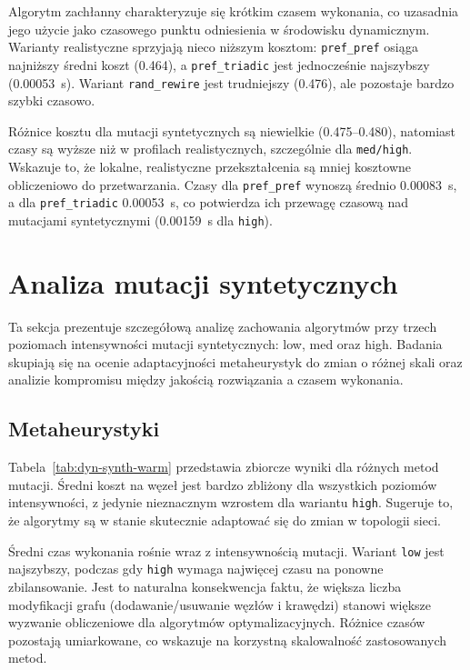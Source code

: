 Algorytm zachłanny charakteryzuje się krótkim czasem wykonania, co uzasadnia jego użycie jako czasowego punktu odniesienia w środowisku dynamicznym. Warianty realistyczne sprzyjają nieco niższym kosztom: \texttt{pref\_pref} osiąga najniższy średni koszt (0.464), a \texttt{pref\_triadic} jest jednocześnie najszybszy (\SI{0.00053}{\s}). Wariant \texttt{rand\_rewire} jest trudniejszy (0.476), ale pozostaje bardzo szybki czasowo.

Różnice kosztu dla mutacji syntetycznych są niewielkie (0.475--0.480), natomiast czasy są wyższe niż w profilach realistycznych, szczególnie dla \texttt{med/high}. Wskazuje to, że lokalne, realistyczne przekształcenia są mniej kosztowne obliczeniowo do przetwarzania. Czasy dla \texttt{pref\_pref} wynoszą średnio \SI{0.00083}{\s}, a dla \texttt{pref\_triadic} \SI{0.00053}{\s}, co potwierdza ich przewagę czasową nad mutacjami syntetycznymi (\SI{0.00159}{\s} dla \texttt{high}).

\section{Analiza mutacji syntetycznych}

Ta sekcja prezentuje szczegółową analizę zachowania algorytmów przy trzech poziomach intensywności mutacji syntetycznych: low, med oraz high. Badania skupiają się na ocenie adaptacyjności metaheurystyk do zmian o różnej skali oraz analizie kompromisu między jakością rozwiązania a czasem wykonania.

\subsection{Metaheurystyki}

Tabela~\ref{tab:dyn-synth-warm} przedstawia zbiorcze wyniki dla różnych metod mutacji. Średni koszt na węzeł jest bardzo zbliżony dla wszystkich poziomów intensywności, z jedynie nieznacznym wzrostem dla wariantu \texttt{high}. Sugeruje to, że algorytmy są w stanie skutecznie adaptować się do zmian w topologii sieci.

Średni czas wykonania rośnie wraz z intensywnością mutacji. Wariant \texttt{low} jest najszybszy, podczas gdy \texttt{high} wymaga najwięcej czasu na ponowne zbilansowanie. Jest to naturalna konsekwencja faktu, że większa liczba modyfikacji grafu (dodawanie/usuwanie węzłów i krawędzi) stanowi większe wyzwanie obliczeniowe dla algorytmów optymalizacyjnych. Różnice czasów pozostają umiarkowane, co wskazuje na korzystną skalowalność zastosowanych metod.

